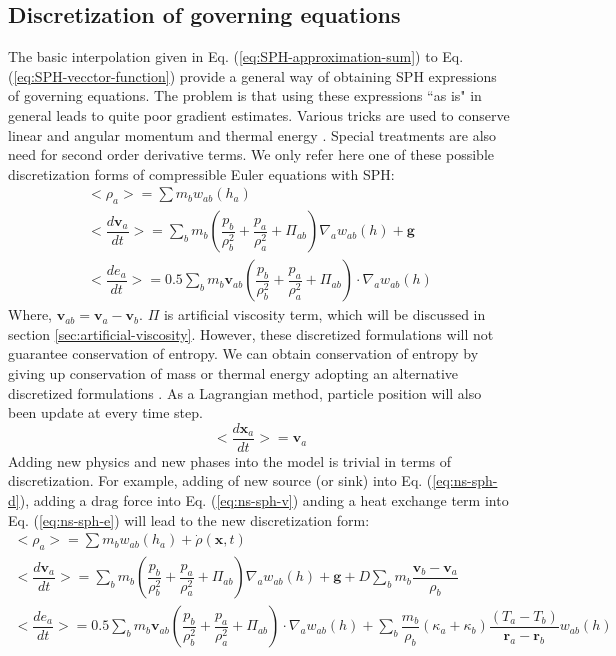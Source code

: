 \documentclass[journal abbreviation, manuscript]{copernicus}
\begin{document}
\subsection{Discretization of governing equations}
The basic interpolation given in Eq. (\ref{eq:SPH-approximation-sum}) to Eq. (\ref{eq:SPH-vecctor-function}) provide a general way of obtaining SPH expressions of governing equations. The problem is that using these expressions ``{as is}" in general leads to quite poor gradient estimates. Various tricks are used to conserve linear and angular momentum and thermal energy \citep{monaghan1992smoothed}. Special treatments are also need for second order derivative terms. We only refer here one of these possible discretization forms of compressible Euler equations with SPH:
\begin{align}
<\rho_a> = \sum m_b w_{ab} (h_a) \label{eq:ns-sph-d} \\
<\dfrac{d \textbf{v}_a}{d t}>= \sum_b m_b (\dfrac{p_b}{\rho_b^2} + \dfrac{p_a}{\rho_a^2} + \Pi_{ab}) \nabla_a w_{a b}(h) +\textbf{g} \label{eq:ns-sph-v} \\
<\dfrac{d e_a}{d t}>=
 0.5\sum_b m_b \textbf{v}_{a b}(\dfrac{p_b}{\rho_b^2} + \dfrac{p_a}{\rho_a^2} + \Pi_{ab}) \cdot \nabla_a w_{a b}(h) \label{eq:ns-sph-e}
\end{align}
Where, $\textbf{v}_{a b} = \textbf{v}_a - \textbf{v}_b$. $\Pi$ is artificial viscosity term, which will be discussed in section \ref{sec:artificial-viscosity}.
However, these discretized formulations will not guarantee conservation of entropy. We can obtain conservation of entropy by giving up conservation of mass or thermal energy adopting an alternative discretized formulations \citep{monaghan1992smoothed}. 
As a Lagrangian method, particle position will also been update at every time step.
\begin{equation}
<\dfrac{d \textbf{x}_a}{dt}> = \textbf{v}_a \label{eq:SPH-update-pos}
\end{equation}
Adding new physics and new phases into the model is trivial in terms of discretization. For example, adding of new source (or sink) into Eq.  (\ref{eq:ns-sph-d}), adding a drag force into Eq. (\ref{eq:ns-sph-v})  anding a heat exchange term into Eq. (\ref{eq:ns-sph-e}) will lead to the new discretization form:
\begin{align}
<\rho_a> = \sum m_b w_{ab} (h_a) + \dot{\rho}(\textbf{x},t)\label{eq:ns-source-sph-d} \\
<\dfrac{d \textbf{v}_a}{d t}>= \sum_b m_b (\dfrac{p_b}{\rho_b^2} + \dfrac{p_a}{\rho_a^2} + \Pi_{ab}) \nabla_a w_{a b}(h) +\textbf{g} + D \sum	_b m_b \dfrac{\textbf{v}_b - \textbf{v}_a}{\rho_b} \label{eq:ns-drag-sph-v} \\
<\dfrac{d e_a}{d t}>=
 0.5\sum_b m_b \textbf{v}_{a b}(\dfrac{p_b}{\rho_b^2} + \dfrac{p_a}{\rho_a^2} + \Pi_{ab}) \cdot \nabla_a w_{a b}(h) + \sum_b \dfrac{m_b}{\rho_b}(\kappa_a + \kappa_b) \dfrac{(T_a - T_b)}{\textbf{r}_a - \textbf{r}_b} w_{ab}(h) \label{eq:ns-conduction-sph-e}
\end{align}
\end{document}

